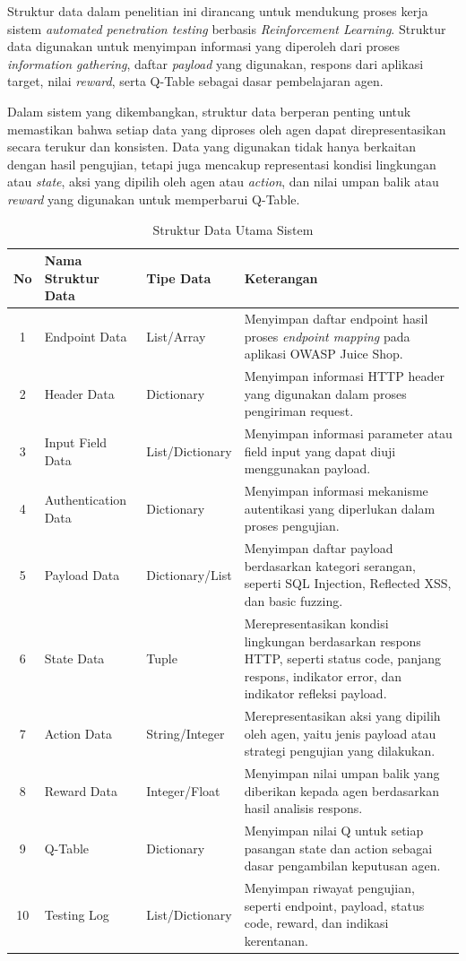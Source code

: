 Struktur data dalam penelitian ini dirancang untuk mendukung proses kerja sistem \textit{automated penetration testing} berbasis \textit{Reinforcement Learning}. Struktur data digunakan untuk menyimpan informasi yang diperoleh dari proses \textit{information gathering}, daftar \textit{payload} yang digunakan, respons dari aplikasi target, nilai \textit{reward}, serta Q-Table sebagai dasar pembelajaran agen.

Dalam sistem yang dikembangkan, struktur data berperan penting untuk memastikan bahwa setiap data yang diproses oleh agen dapat direpresentasikan secara terukur dan konsisten. Data yang digunakan tidak hanya berkaitan dengan hasil pengujian, tetapi juga mencakup representasi kondisi lingkungan atau \textit{state}, aksi yang dipilih oleh agen atau \textit{action}, dan nilai umpan balik atau \textit{reward} yang digunakan untuk memperbarui Q-Table.

\begin{table}[H]
\centering
\begin{tabular}{|c|l|l|p{6.5cm}|}
\hline
\textbf{No} & \textbf{Nama Struktur Data} & \textbf{Tipe Data} & \textbf{Keterangan} \\ \hline

1 & Endpoint Data & List/Array & Menyimpan daftar endpoint hasil proses \textit{endpoint mapping} pada aplikasi OWASP Juice Shop. \\ \hline
2 & Header Data & Dictionary & Menyimpan informasi HTTP header yang digunakan dalam proses pengiriman request. \\ \hline
3 & Input Field Data & List/Dictionary & Menyimpan informasi parameter atau field input yang dapat diuji menggunakan payload. \\ \hline
4 & Authentication Data & Dictionary & Menyimpan informasi mekanisme autentikasi yang diperlukan dalam proses pengujian. \\ \hline
5 & Payload Data & Dictionary/List & Menyimpan daftar payload berdasarkan kategori serangan, seperti SQL Injection, Reflected XSS, dan basic fuzzing. \\ \hline
6 & State Data & Tuple & Merepresentasikan kondisi lingkungan berdasarkan respons HTTP, seperti status code, panjang respons, indikator error, dan indikator refleksi payload. \\ \hline
7 & Action Data & String/Integer & Merepresentasikan aksi yang dipilih oleh agen, yaitu jenis payload atau strategi pengujian yang dilakukan. \\ \hline
8 & Reward Data & Integer/Float & Menyimpan nilai umpan balik yang diberikan kepada agen berdasarkan hasil analisis respons. \\ \hline
9 & Q-Table & Dictionary & Menyimpan nilai Q untuk setiap pasangan state dan action sebagai dasar pengambilan keputusan agen. \\ \hline
10 & Testing Log & List/Dictionary & Menyimpan riwayat pengujian, seperti endpoint, payload, status code, reward, dan indikasi kerentanan. \\ \hline

\end{tabular}
\caption{Struktur Data Utama Sistem}
\label{tab:struktur_data_utama}
\end{table}

